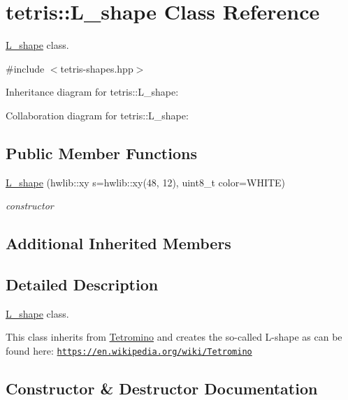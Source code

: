 \hypertarget{classtetris_1_1L__shape}{}\section{tetris\+:\+:L\+\_\+shape Class Reference}
\label{classtetris_1_1L__shape}


\hyperlink{classtetris_1_1L__shape}{L\+\_\+shape} class.  




{\ttfamily \#include $<$tetris-\/shapes.\+hpp$>$}



Inheritance diagram for tetris\+:\+:L\+\_\+shape\+:


Collaboration diagram for tetris\+:\+:L\+\_\+shape\+:
\subsection*{Public Member Functions}
\begin{DoxyCompactItemize}
\item 
\hyperlink{classtetris_1_1L__shape_a032c76f0f86df78c7e26b5171f74b0e9}{L\+\_\+shape} (hwlib\+::xy s=hwlib\+::xy(48, 12), uint8\+\_\+t color=W\+H\+I\+TE)
\begin{DoxyCompactList}\small\item\em constructor \end{DoxyCompactList}\end{DoxyCompactItemize}
\subsection*{Additional Inherited Members}


\subsection{Detailed Description}
\hyperlink{classtetris_1_1L__shape}{L\+\_\+shape} class. 

This class inherits from \hyperlink{classtetris_1_1Tetromino}{Tetromino} and creates the so-\/called L-\/shape as can be found here\+: \href{https://en.wikipedia.org/wiki/Tetromino}{\tt https\+://en.\+wikipedia.\+org/wiki/\+Tetromino} 

\subsection{Constructor \& Destructor Documentation}
\mbox{\label{classtetris_1_1L__shape_a032c76f0f86df78c7e26b5171f74b0e9}} 
